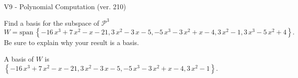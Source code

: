 \begin{exercise}
  \begin{exerciseTitle}V9 - Polynomial Computation (ver. 210)\end{exerciseTitle}
  \begin{exerciseStatement}
    Find a basis for the subspace of \(\mathcal{P}^3\) 
\[W=\mathrm{span}\ \left\{-16 \, x^{3} + 7 \, x^{2} - x - 21 , 3 \, x^{2} - 3 \, x - 5 , -5 \, x^{3} - 3 \, x^{2} + x - 4 , 3 \, x^{2} - 1 , 3 \, x^{3} - 5 \, x^{2} + 4\right\}.\]
 Be sure to explain why your result is a basis.


  \end{exerciseStatement}
  \begin{exerciseAnswer}
   A basis of \(W\) is  \(\left\{-16 \, x^{3} + 7 \, x^{2} - x - 21 , 3 \, x^{2} - 3 \, x - 5 , -5 \, x^{3} - 3 \, x^{2} + x - 4 , 3 \, x^{2} - 1\right\}\).
  


  \end{exerciseAnswer}
\end{exercise}